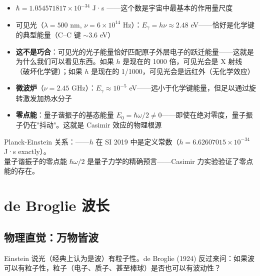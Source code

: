 
\begin{oombox}
  \begin{itemize}
    \item $\hbar = 1.054571817\times10^{-34}$ J·s ——这个数是宇宙中最基本的作用量尺度
    \item 可见光（$\lambda=500$ nm, $\nu=6\times10^{14}$ Hz）：$E_\gamma = h\nu \approx 2.48$ eV——恰好是化学键的典型能量（C--C 键 $\sim 3.6$ eV）
    \item \textbf{这不是巧合}：可见光的光子能量恰好匹配原子外层电子的跃迁能量——这就是为什么我们可以看见东西。如果 $h$ 是现在的 1000 倍，可见光会是 X 射线（破坏化学键）；如果 $h$ 是现在的 1/1000，可见光会是远红外（无化学效应）
    \item \textbf{微波炉}（$\nu=2.45$ GHz）：$E_\gamma \approx 10^{-5}$ eV——远小于化学键能量，但足以通过旋转激发加热水分子
    \item \textbf{零点能}：量子谐振子的基态能量 $E_0 = \hbar\omega/2 \neq 0$——即使在绝对零度，量子振子仍在"抖动"。这就是 Casimir 效应的物理根源
  \end{itemize}
\end{oombox}

\precisionbox[精度等级]
  Planck-Einstein 关系：\precexact——$h$ 在 SI 2019 中是定义常数（$h = 6.62607015\times 10^{-34}$ J·s exactly）。\\
  量子谐振子的零点能 $\hbar\omega/2$ 是量子力学的精确预言——Casimir 力实验验证了零点能的存在。
\endprecisionbox

\section{de Broglie 波长}

\subsection{物理直觉：万物皆波}

Einstein 说光（经典上认为是波）有粒子性。de Broglie (1924) 反过来问：如果波可以有粒子性，粒子（电子、质子、甚至棒球）是否也可以有波动性？

